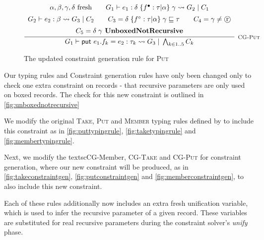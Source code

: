 \begin{figure}
    \centering
    \[
        \infer[\textsc{\footnotesize{CG-Put}}]{
            G_1 \vdash \textsf{put } e_1.f_k = e_2 : \tau_k \rightsquigarrow G_3\; 
                |\; \bigwedge_{k \in 1..5} C_k
        }{
            \begin{array}{c}
                \alpha, \beta, \gamma, \delta \text{ fresh}
                \hspace{2em}
                G_1 \vdash e_1 : \delta\; \{ f^\bullet: \tau | \alpha \}\; 
                    \gamma \rightsquigarrow G_2\; |\; C_1 \\[5pt]
                G_2 \vdash e_2 : \beta \rightsquigarrow G_3\; |\; C_2
                \hspace{2em}
                C_3 =  \delta\; \{ f^\circ : \tau | \alpha \}\; 
                    \gamma \subtype \tau
                \hspace{2em}
                C_4 = \gamma \neq \text{\textcircled{r}} \\[5pt]
                C_5 = \delta\; \gamma \textbf{ UnboxedNotRecursive}
            \end{array}
        }
    \]
    
    \caption{The updated constraint generation rule for \textsc{Put}}
    \label{fig:putconstraintgen}
\end{figure}




Our typing rules and Constraint generation rules have only been changed only to check one extra
constraint on records - that recursive parameters are only used on boxed records. The check for this
new constraint is outlined in \autoref{fig:unboxednotrecursive}

We modify the original \textsc{Take}, \textsc{Put} and \textsc{Member} typing rules defined by
\citet{LiamThesis} to include this constraint as in \autoref{fig:puttypingrule},
\autoref{fig:taketypingrule} and \autoref{fig:membertypingrule}.

Next, we modify the textsc{CG-Member}, \textsc{CG-Take} and \textsc{CG-Put} for constraint generation,
where our new constraint will be produced, as in \autoref{fig:takeconstraintgen}, 
\autoref{fig:putconstraintgen} and \autoref{fig:memberconstraintgen}, to also include this
new constraint.

Each of these rules additionally now includes an extra fresh unification variable, which is
used to infer the recursive parameter of a given record. These variables are substituted
for real recursive parameters during the constraint solver's \textit{unify} phase.

